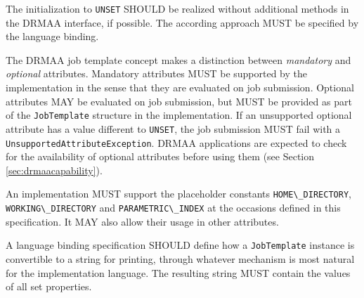 \documentclass{article}
\newcommand{\h}[1]{\lstinline|#1|}
\newcommand{\langbind}[1]{\begin{shaded}#1\end{shaded}}
\newcommand{\rat}[1]{}
\begin{document}
\langbind{
The initialization to \h{UNSET} SHOULD be realized without additional methods in the DRMAA interface, if possible. The according approach MUST be specified by the language binding. 
}

The DRMAA job template concept makes a distinction between \emph{mandatory} and \emph{optional} attributes. Mandatory attributes MUST be supported by the implementation in the sense that they are evaluated on job submission. Optional attributes MAY be evaluated on job submission, but MUST be provided as part of the \h{JobTemplate} structure in the implementation. If an unsupported optional attribute has a value different to \h{UNSET}, the job submission MUST fail with a \h{UnsupportedAttributeException}. DRMAA applications are expected to check for the availability of optional attributes before using them (see Section \ref{sec:drmaacapability}).

An implementation MUST support the placeholder constants \h{HOME\_DIRECTORY}, \h{WORKING\_DIRECTORY} and \h{PARAMETRIC\_INDEX} at the occasions defined in this specification. It MAY also allow their usage in other attributes.

\langbind{
A language binding specification SHOULD define how a \h{JobTemplate} instance is convertible to a string for printing, through whatever mechanism is most natural for the implementation language. The resulting string MUST contain the values of all set properties.
}

\rat{
Comparison to DRMAA 1.0: JobTemplate is now a value type, meaning that it maps to a struct in C. This removes the need for DRMAA-defined methods for construction and destruction of job templates. An eventual RPC scenario for DRMAA gets easier with this approach, since it is closer to the JSDL concept of a job description document. 

Supported placeholders for job template attributes must be filled with values by the language binding or the implementation. Invalid job template settings are now only detected on job submission, not when the attribute is set. 

DRMAA1 supported the utilization of new DRM features through an old DRMAA implementation, based on the \h{nativeSpecification} field. A conf call (Jul 14th 2010) voted for dropping this intentionally. Implementations should use according implementation-specific attributes for this.

GridEngine does not support to request a number of slots per machine - of course in a default installation, since you can do everything in GridEngine ... This is the reason for not having such an attribute.
}
\end{document}
